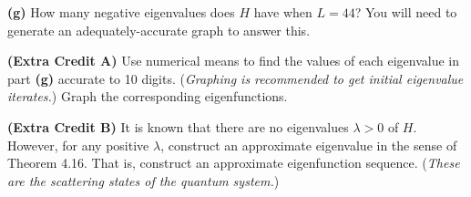 \documentclass[12pt]{amsart}
\newcommand{\epart}[1]{\medskip\noindent\textbf{(#1)}\quad }
\begin{document}
\epart{g}  How many negative eigenvalues does $H$ have when $L=44$?  You will need to generate an adequately-accurate graph to answer this.

\medskip
\epart{Extra Credit A}  Use numerical means to find the values of each eigenvalue in part \textbf{(g)} accurate to 10 digits.  (\emph{Graphing is recommended to get initial eigenvalue iterates.})  Graph the corresponding eigenfunctions.

\epart{Extra Credit B}  It is known that there are no eigenvalues $\lambda>0$ of $H$.  However, for any positive $\lambda$, construct an approximate eigenvalue in the sense of Theorem 4.16.  That is, construct an approximate eigenfunction sequence.  (\emph{These are the \emph{scattering states} of the quantum system.})
\end{document}
